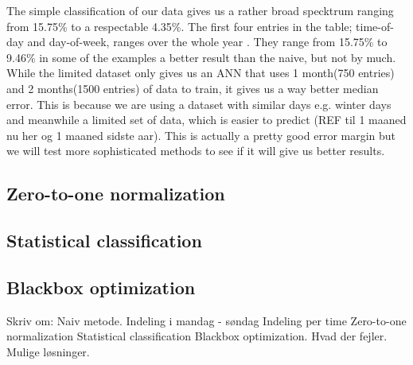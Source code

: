 \begin{table}[!ht]
\centering  %
\caption{Results from the simple classification approach} %
\label{table:naiveTrainingApproach} %
\end{table}

The simple classification of our data gives us a rather broad specktrum ranging from 15.75\% to a respectable 4.35\%. The first four entries in the table; time-of-day and day-of-week, ranges over the whole year . They range from 15.75\% to 9.46\% in some of the examples a better result than the naive, but not by much. While the limited dataset only gives us an ANN that uses 1 month(750 entries) and 2 months(1500 entries) of data to train, it gives us a way better median error. This is because we are using a dataset with similar days e.g. winter days and meanwhile a limited set of data, which is easier to predict (REF til 1 maaned nu her og 1 maaned sidste aar). This is actually a pretty good error margin but we will test more sophisticated methods to see if it will give us better results. 

\subsection{Zero-to-one normalization}

\subsection{Statistical classification}

\subsection{Blackbox optimization}

Skriv om:
	Naiv metode.
	Indeling i mandag - søndag
	Indeling per time
	Zero-to-one normalization
	Statistical classification
	Blackbox optimization.
	Hvad der fejler.
	Mulige løsninger.